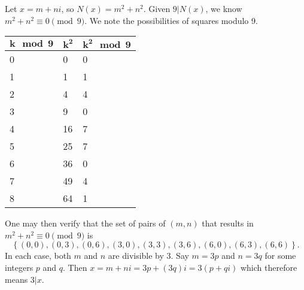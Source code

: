 \begin{questions}
\begin{partquestions}{\alph*}
\begin{partquestions}{\roman*}
            \item Let $x = m+ni$, so $N(x) = m^2 + n^2$. Given $9 \vert N(x)$, we know $m^2 + n^2 \equiv 0 \pmod9$. We note the possibilities of squares modulo 9.
            \begin{table}[H]
                \centering
                \begin{tabular}{|l|l|l|}
                    \hline
                    $\boldsymbol{k \mod9}$ & $\boldsymbol{k^2}$ & $\boldsymbol{k^2 \mod9}$ \\ \hline
                    0 & 0 & 0 \\ \hline
                    1 & 1 & 1 \\ \hline
                    2 & 4 & 4 \\ \hline
                    3 & 9 & 0 \\ \hline
                    4 & 16 & 7 \\ \hline
                    5 & 25 & 7 \\ \hline
                    6 & 36 & 0 \\ \hline
                    7 & 49 & 4 \\ \hline
                    8 & 64 & 1 \\ \hline
                \end{tabular}
            \end{table}
            One may then verify that the set of pairs of $(m,n)$ that results in $m^2 + n^2 \equiv 0 \pmod9$ is
            \[
                \left\{(0,0),(0,3),(0,6),(3,0),(3,3),(3,6),(6,0),(6,3),(6,6)\right\}.
            \]
            In each case, both $m$ and $n$ are divisible by 3. Say $m = 3p$ and $n = 3q$ for some integers $p$ and $q$. Then $x = m + ni = 3p + (3q)i = 3(p+qi)$ which therefore means $3 \vert x$.


\end{partquestions}
\end{partquestions}
\end{questions}

